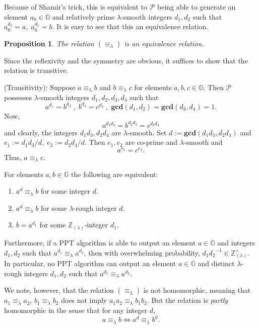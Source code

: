 \documentclass[11pt, lettersize, notitlepage, leqno, footskip=0.6cm]{article}
\newcommand{\bz}{\mathbb Z}
\newcommand{\LRA}{\Longleftrightarrow}
\newcommand{\eqlam}{\equiv_{\lam}}
\newcommand{\mc}{\mathcal}
\newcommand{\mb}{\mathbb}
\newcommand{\mbf}{\mathbf}
\newcommand{\lam}{\lambda}
\newcommand{\lamb}{\lambda}
\newcommand{\bzlam}{\bz_{(\lam)}}
\newcommand{\vs}{\vspace{-0.15cm}}
\newcommand{\noin}{\noindent}
\newcommand{\op}{overwhelming probability}
\newcommand{\GCD}{\mbf{gcd}}
\newtheorem{Prop}[Thm]{Proposition}
\numberwithin{equation}{section}
\begin{document}
{{{\noin Because of Shamir's trick, this is equivalent to $\mc{P}$ being able to generate an element $a_0\in \mb{G}$ and relatively prime $\lamb$-smooth integers $d_1, d_2$ such that $a_0^{d_2} = a, \; a_0^{d_1} = b.$ It is easy to see that this an equivalence relation.

\begin{Prop} The relation $(\equiv_{\lam})$ is an equivalence relation.\end{Prop}

\begin{prf} Since the reflexivity and the symmetry are obvious, it suffices to show that the relation is transitive.

\noin (Transitivity): Suppose $a \equiv_{\lam} b$ and $b \equiv_{\lam} c$ for elements $a, b, c\in\mb{G}$. Then $\mc{P}$ possesses $\lam$-smooth integers $d_1,d_2, d_3, d_4$ such that \vs $$a^{d_1} = b^{d_2}\;,\; b^{d_3} = c^{d_4}\;,\;\GCD(d_1,d_2) = \GCD(d_3,d_4) = 1.$$ Now, \vs $$a^{d_1d_3} = b^{d_2d_3} = c^{d_2 d_4}$$ and clearly, the integers $d_1d_3, d_2 d_4$ are $\lam$-smooth. Set $d:= \GCD(d_1d_3, d_2 d_4)$ and $e_1:= d_1d_3/d,\; e_2:= d_2 d_4/d$. Then $e_1,e_2$ are co-prime and $\lam$-smooth and \vs $$ a^{e_1} = c^{e_2} .$$ Thus, $a \equiv_{\lam} c$.\end{prf}

For elements $a,b\in\mb{G}$ the following are equivalent:\begin{enumerate}[wide, labelwidth=!, labelindent=0pt] \vs

\item $a^d\eqlam b$ for some integer $d$.\vs
\item $a^d\eqlam b$ for some $\lam$-rough integer $d$.\vs
\item $b = a^{d_1}$ for some $\bzlam$-integer $d_1$.\end{enumerate}

Furthermore, if a PPT algorithm is able to output an element $a\in\mb{G}$ and integers $d_1,d_2$ such that $a^{d_1}\eqlam a^{d_2}$, then with \op, ${d_1}{d_2}^{-1}\in\bzlam^{\times}$. In particular, no PPT algorithm can output an element $a\in \mb{G}$ and distinct $\lam$-rough integers $d_1,d_2$ such that $a^{d_1}\eqlam a^{d_2}$.

We note, however, that the relation $(\equiv_{\lam})$ is not homomorphic, meaning that $a_1 \equiv_{\lam} a_2$, $b_1 \equiv_{\lam} b_2$ does not imply $a_1a_2 \eqlam b_1b_2$. But the relation is \textit{partly} homomorphic in the sense that for any integer $d$, \vs $$ a \equiv_{\lam} b \LRA a^d \equiv_{\lam} b^d .$$ 


}}}
\end{document}
